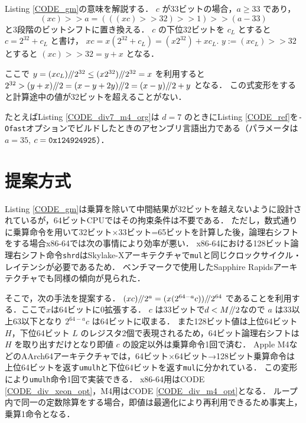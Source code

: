 \documentclass{jarticle}
\begin{document}


Listing \ref{CODE_gm}の意味を解説する．
$c$ が33ビットの場合，$a \ge 33$ であり，
$$(x c)>>a=(((x c) >> 32) >> 1) >> (a-33)$$
と3段階のビットシフトに置き換える．
$c$ の下位32ビットを $c_L$ とすると $c=2^{32} + c_L$ と書け，
$x c = x (2^{32} + c_L) = (x 2^{32}) + x c_L$.
$y:=(x c_L)>>32$ とすると $(x c)>>32 = y+x$ となる．

ここで $y=(x c_L) {\mathbin{/\mkern-4mu/}} 2^{32}\le(x 2^{32}) {\mathbin{/\mkern-4mu/}} 2^{32} = x$ を利用すると
$2^{32}>(y+x) {\mathbin{/\mkern-4mu/}} 2=(x-y+2 y) {\mathbin{/\mkern-4mu/}} 2=(x-y) {\mathbin{/\mkern-4mu/}} 2+y$ となる．
この式変形をすると計算途中の値が32ビットを超えることがない．

たとえばListing \ref{CODE_div7_m4_org}は $d=7$ のときにListing \ref{CODE_ref}を{\tt -Ofast}オプションでビルドしたときのアセンブリ言語出力である（パラメータは$a=35$,  $c={\tt 0x124924925}$）．



\section{提案方式}
Listing \ref{CODE_gm}は乗算を除いて中間結果が32ビットを越えないように設計されているが，64ビットCPUではその拘束条件は不要である．
ただし，数式通りに乗算命令を用いて32ビット×33ビット=65ビットを計算した後，論理右シフトをする場合x86-64では次の事情により効率が悪い．
x86-64における128ビット論理右シフト命令{\tt shrd}はSkylake-Xアーキテクチャで{\tt mul}と同じクロックサイクル・レイテンシが必要であるため\cite{anger}．
ベンチマークで使用したSapphire Rapidsアーキテクチャでも同様の傾向が見られた．


そこで，次の手法を提案する．
$(x c) {\mathbin{/\mkern-4mu/}} 2^a=(x (2^{64-a} c)) {\mathbin{/\mkern-4mu/}} 2^{64}$ であることを利用する．ここで$x$は64ビットに0拡張する．
$c$ は33ビットで$d<M {\mathbin{/\mkern-4mu/}} 2$なので $a$ は33以上63以下となり $2^{64-a} c$ は64ビットに収まる．
また128ビット値は上位64ビット $H$，下位64ビット $L$ のレジスタ2個で表現されるため，64ビット論理右シフトは $H$ を取り出すだけとなり即値 $c$ の設定以外は乗算命令1回で済む．
Apple M4などのAArch64アーキテクチャでは，64ビット×64ビット→128ビット乗算命令は上位64ビットを返す{\tt umulh}と下位64ビットを返す{\tt mul}に分かれている．
この変形により{\tt umulh}命令1回で実装できる．
x86-64用はCODE \ref{CODE_div_xeon_opt}，M4用はCODE \ref{CODE_div_m4_opt}となる．
ループ内で同一の定数除算をする場合，即値は最適化により再利用できるため事実上，乗算1命令となる．
\end{document}

